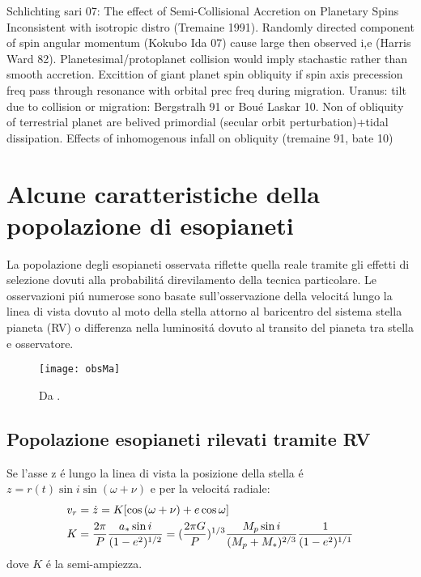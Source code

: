 \begin{workout}
Schlichting sari 07: The effect of Semi-Collisional Accretion on Planetary Spins
Inconsistent with isotropic distro (Tremaine 1991). Randomly directed component of spin angular momentum (Kokubo Ida 07) cause large then observed i,e (Harris Ward 82).
Planetesimal/protoplanet collision would imply stachastic rather than smooth accretion.
Excittion of giant planet spin obliquity if spin axis precession freq pass through resonance with orbital prec freq during migration.
Uranus: tilt due to collision or migration: Bergstralh 91 or Bou\'e Laskar 10.
Non of obliquity of terrestrial planet are belived primordial (secular orbit perturbation)+tidal dissipation.
Effects of inhomogenous infall on obliquity (tremaine 91, bate 10)
\end{workout}



{\let\clearpage\relax\let\cleardoublepage\relax
\chapter{Alcune caratteristiche della popolazione di esopianeti}
}

La popolazione degli esopianeti osservata riflette quella reale tramite gli effetti di selezione dovuti alla probabilit\'a direvilamento della tecnica particolare. Le osservazioni pi\'u numerose sono basate sull'osservazione della velocit\'a lungo la linea di vista dovuto al moto della stella attorno al baricentro del sistema stella pianeta (RV) o differenza nella luminosit\'a dovuto al transito del pianeta tra stella e osservatore.

\begin{figure}[!ht]
\texttt{[image: obsMa]}\label{fig:Maplot}
\caption{Da \cite{mordasini2018}.}
\end{figure}

\section{Popolazione esopianeti rilevati tramite RV}

Se l'asse z \'e lungo la linea di vista la posizione della stella \'e $z=r(t)\sin{i}\sin{(\omega+\nu)}$ e per la velocit\'a radiale:
\begin{align}
&v_r=\dot{z}=K[\cos{(\omega+\nu)}+e\cos{\omega}]\label{eq:vrsignal}\\
&K=\frac{2\pi}{P}\frac{a_*\sin{i}}{(1-e^2)^{1/2}}=(\frac{2\pi G}{P})^{1/3}\frac{M_p\sin{i}}{(M_p+M_*)^{2/3}}\frac{1}{(1-e^2)^{1/1}}
\end{align}
dove $K$ \'e la semi-ampiezza.

